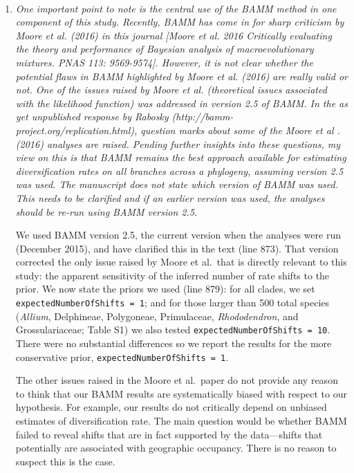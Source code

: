 \documentclass[11pt]{letter}
\begin{document}
\begin{letter}{ \\

}
\begin{enumerate}
\item \textit{One important point to note is the central use of the
    BAMM method in one component of this study. Recently, BAMM has
    come in for sharp criticism by Moore et al. (2016) in this journal
    [Moore et al. 2016 Critically evaluating the theory and
    performance of Bayesian analysis of macroevolutionary
    mixtures. PNAS 113: 9569-9574]. However, it is not clear whether
    the potential flaws in BAMM highlighted by Moore et al. (2016) are
    really valid or not. One of the issues raised by Moore et
    al. (theoretical issues associated with the likelihood function)
    was addressed in version 2.5 of BAMM.  In the as yet unpublished
    response by Rabosky (http://bamm-project.org/replication.html),
    question marks about some of the Moore et al .(2016) analyses are
    raised.  Pending further insights into these questions, my view on
    this is that BAMM remains the best approach available for
    estimating diversification rates on all branches across a
    phylogeny, assuming version 2.5 was used. The manuscript does not
    state which version of BAMM was used. This needs to be clarified
    and if an earlier version was used, the analyses should be re-run
    using BAMM version 2.5.}

  We used BAMM version 2.5, the current version when the analyses were
  run (December 2015), and have clarified this in the text (line
  873). That version corrected the only issue raised by Moore et al.\
  that is directly relevant to this study: the apparent sensitivity of
  the inferred number of rate shifts to the prior. We now state the
  priors we used (line 879): for all clades, we set
  \texttt{expectedNumberOfShifts = 1}; and for those larger than 500
  total species (\textit{Allium}, Delphineae, Polygoneae, Primulaceae,
  \textit{Rhododendron}, and Grossulariaceae; Table S1) we also tested
  \texttt{expectedNumberOfShifts = 10}. There were no substantial
  differences so we report the results for the more conservative
  prior, \texttt{expectedNumberOfShifts = 1}.

  The other issues raised in the Moore et al.\ paper do not provide
  any reason to think that our BAMM results are systematically biased
  with respect to our hypothesis. For example, our results do not
  critically depend on unbiased estimates of diversification rate. The
  main question would be whether BAMM failed to reveal shifts that are
  in fact supported by the data---shifts that potentially are
  associated with geographic occupancy. There is no reason to suspect
  this is the case.


\end{enumerate}
\end{letter}
\end{document}
